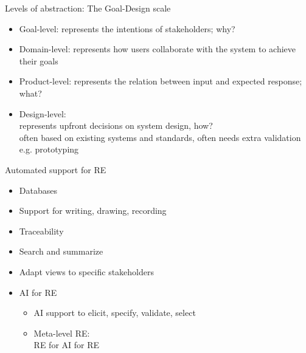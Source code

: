 \documentclass{beamer}
\begin{document}
\begin{frame}[fragile]{Levels of abstraction: The Goal-Design scale}
\begin{itemize}
\item Goal-level: represents the intentions of stakeholders; why? 
\item Domain-level: represents how users collaborate with the system to achieve their goals
\item Product-level: represents the relation between input and expected response; what?
\item Design-level:\\represents upfront decisions on system design, how?\\often based on existing systems and standards, often needs extra validation e.g. prototyping
\end{itemize}
\end{frame}

\begin{frame}[fragile]{Automated support for RE}
\begin{itemize}
\item Databases
\item Support for writing, drawing, recording
\item Traceability 
\item Search and summarize
\item Adapt views to specific stakeholders
\item AI for RE
\begin{itemize}
\item AI support to elicit, specify, validate, select 
\item Meta-level RE:\\RE for AI for RE
\end{itemize}
\end{itemize}
\end{frame}
\end{document}
